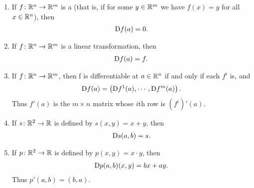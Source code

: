 \begin{theorem}
    \begin{enumerate}[label={\upshape(\arabic*)}]
        \item If $f\colon{}\mathbb{R}^n\to \mathbb{R}^m$ is a  (that is, if for some
            $y \in \mathbb{R}^m$ we have $f(x) = y$ for all $x \in \mathbb{R}^n$), then
            \begin{align*}
                \mathrm{D}f(a) = 0.
            \end{align*} 
        \item If $f\colon{}\mathbb{R}^n\to \mathbb{R}^m$ is a linear transformation, then
            \begin{align*}
                \mathrm{D}f(a) = f.
            \end{align*}
        \item If $f\colon{}\mathbb{R}^n\to \mathbb{R}^m$, then f is differentiable at $a\in \mathbb{R}^n$ if and only if 
            each $f^i$ is, and 
            \begin{align*}
                \mathrm{D}f(a) = \left(\mathrm{D}f^1(a), \cdots, \mathrm{D}f^m(a)\right).
            \end{align*}
            Thus $f'(a)$ is the $m\times n$ matrix whose $i$th row is $\left(f^i\right)'(a)$.
        \item If $s\colon \mathbb{R}^2\to \mathbb{R}$ is defined by $s(x, y) = x+y$, then 
            \begin{align*}
                \mathrm{D}s(a, b) = s.
            \end{align*}
        \item If $p\colon \mathbb{R}^2\to \mathbb{R}$ is defined by $p(x, y) = x\cdot y$, then 
            \begin{align*}
                \mathrm{D}p(a, b)(x, y) = bx + ay.
            \end{align*}
            Thus $p'(a, b) = (b, a)$.
    \end{enumerate}
\end{theorem}

